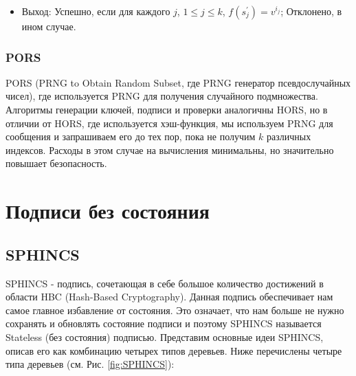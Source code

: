 \documentclass[a4paper, 14pt]{extarticle}
\begin{document}
\begin{itemize}
\begin{itemize}
        \item Выход: Успешно, если для каждого $j$, $1 \leq j \leq k$, $f(s^{'}_{j}) = v^{i_{j}}$; Отклонено, в ином случае.
    \end{itemize}

\end{itemize}

\subsubsection{PORS}
PORS (PRNG to Obtain Random Subset, где PRNG генератор псевдослучайных чисел), где используется PRNG для получения случайного подмножества. Алгоритмы генерации ключей, подписи и проверки аналогичны HORS, но в отличии от HORS, где используется хэш-функция, мы используем PRNG для сообщения и запрашиваем его до тех пор, пока не получим $k$ различных индексов. Расходы в этом случае на вычисления минимальны, но значительно повышает безопасность.

\section{Подписи без состояния}
\subsection{SPHINCS}
SPHINCS \cite{stateless} - подпись, сочетающая в себе большое количество достижений в области HBC (Hash-Based Cryptography). Данная подпись обеспечивает нам самое главное избавление от состояния. Это означает, что нам больше не нужно сохранять и обновлять состояние подписи и поэтому SPHINCS называется Stateless (без состояния) подписью.
Представим основные идеи SPHINCS, описав его как комбинацию четырех типов деревьев. Ниже перечислены четыре типа деревьев (см. Рис. \ref{fig:SPHINCS}):
\end{document}
